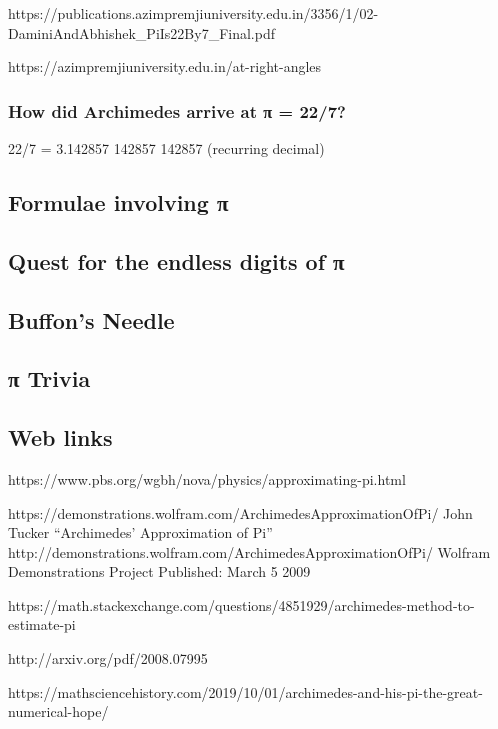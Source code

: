\documentclass[
  a4paper,
]{article}
\begin{document}
https://publications.azimpremjiuniversity.edu.in/3356/1/02-DaminiAndAbhishek\_PiIs22By7\_Final.pdf

https://azimpremjiuniversity.edu.in/at-right-angles

\subsubsection{How did Archimedes arrive at π =
22/7?}\label{how-did-archimedes-arrive-at-ux3c0-227}

22/7 = 3.142857 142857 142857 (recurring decimal)

\subsection{Formulae involving π}\label{formulae-involving-ux3c0}

\subsection{Quest for the endless digits of
π}\label{quest-for-the-endless-digits-of-ux3c0}

\subsection{Buffon's Needle}\label{buffons-needle}

\subsection{π Trivia}\label{ux3c0-trivia}

\subsection{Web links}\label{web-links}

https://www.pbs.org/wgbh/nova/physics/approximating-pi.html

https://demonstrations.wolfram.com/ArchimedesApproximationOfPi/ John
Tucker ``Archimedes' Approximation of Pi''
http://demonstrations.wolfram.com/ArchimedesApproximationOfPi/ Wolfram
Demonstrations Project Published: March 5 2009

https://math.stackexchange.com/questions/4851929/archimedes-method-to-estimate-pi

http://arxiv.org/pdf/2008.07995

https://mathsciencehistory.com/2019/10/01/archimedes-and-his-pi-the-great-numerical-hope/
\end{document}
